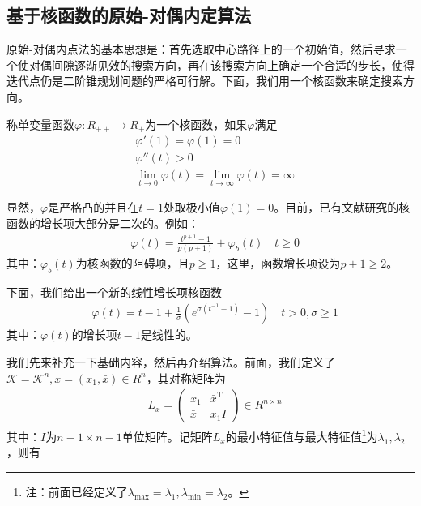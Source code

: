     \subsection{基于核函数的原始-对偶内定算法}
        \par
        原始-对偶内点法的基本思想是：首先选取中心路径上的一个初始值，然后寻求一个使对偶间隙逐渐见效的搜索方向，再在该搜索方向上确定一个合适的步长，使得迭代点仍是二阶锥规划问题的严格可行解。下面，我们用一个核函数来确定搜索方向。
        \begin{definition}[核函数]
        称单变量函数$\varphi:R_{++}\to R_{+}$为一个核函数，如果$\varphi$满足
        \begin{align*}
        & {\varphi}'(1)={\varphi}(1)=0\\
        & {\varphi}''(t)>0\\
        & \mathop{\lim}\limits_{t\to 0}\varphi(t)=\mathop{\lim}\limits_{t\to \infty}\varphi(t)=\infty
        \end{align*}
        \end{definition}
        \par
        显然，$\varphi$是严格凸的并且在$t=1$处取极小值$\varphi(1)=0$。目前，已有文献研究的核函数的增长项大部分是二次的。例如：
        \begin{align*}
        & {\varphi}(t)=\frac{t^{p+1}-1}{p(p+1)}+{\varphi}_b(t)\quad t \geqslant 0
        \end{align*}
        其中：${\varphi}_b(t)$为核函数的阻碍项，且$p \geqslant 1$，这里，函数增长项设为$p+1\geqslant 2$。
        \par
        下面，我们给出一个新的线性增长项核函数
        \begin{align*}
        & {\varphi}(t)=t-1+\frac{1}{\sigma}(e^{\sigma(t^{-1}-1)}-1)\quad t > 0,\sigma \geqslant 1
        \end{align*}
        其中：${\varphi}(t)$的增长项$t-1$是线性的。
        \par
        我们先来补充一下基础内容，然后再介绍算法。前面，我们定义了$\mathcal{K}=\mathcal{K}^n,x=(x_1,\bar{x})\in R^n$，其对称矩阵为
        \begin{align*}
        & L_x=\begin{pmatrix} x_1 & \bar{x}^\mathrm{T} \\\bar{x} & {x_1}I\end{pmatrix} \in R^{n\times n}
        \end{align*}
        其中：$I$为${n-1}\times {n-1}$单位矩阵。记矩阵$L_x$的最小特征值与最大特征值\footnote{注：前面已经定义了${\lambda}_{\max}={\lambda}_1,{\lambda}_{\min}={\lambda}_2$。}为${\lambda}_{1},{\lambda}_{2}$，则有
